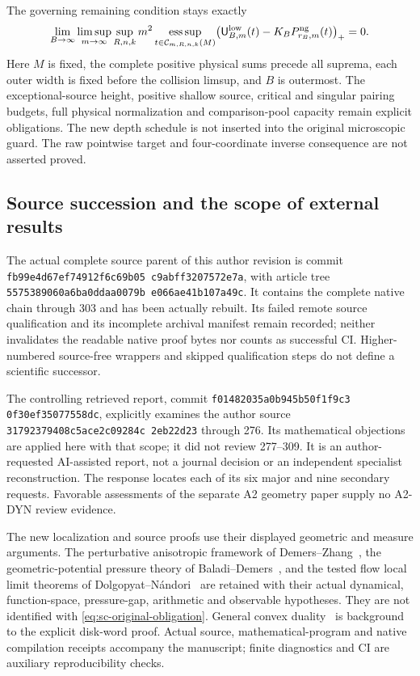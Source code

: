 \documentclass[11pt,reqno]{amsart}
\numberwithin{equation}{section}
\theoremstyle{definition}\newtheorem{definition}[theorem]{Definition}
\theoremstyle{remark}\newtheorem{remark}[theorem]{Remark}
\begin{document}
The governing remaining condition stays exactly
\begin{equation}\label{eq:sc-original-obligation}
 \lim_{B\to\infty}\limsup_{m\to\infty}\sup_{R,n,k}
 m^2\operatorname*{ess\,sup}_{t\in\mathcal C_{m,R,n,k}(M)}
 \bigl(\mathsf U^{\rm low}_{B,m}(t)
                   -K_BP^{\rm ng}_{r_B,m}(t)\bigr)_+=0 .
\end{equation}
Here $M$ is fixed, the complete positive physical sums precede all
suprema, each outer width is fixed before the collision limsup,
and $B$ is outermost.  The exceptional-source height, positive
shallow source, critical and singular pairing budgets, full
physical normalization and comparison-pool capacity remain
explicit obligations.  The new depth schedule is not inserted
into the original microscopic guard.  The raw pointwise target
and four-coordinate inverse consequence are not asserted proved.

\subsection*{Source succession and the scope of external results}
The actual complete source parent of this author revision is
commit
\texttt{fb99e4d6\allowbreak 7ef74912\allowbreak f6c69b05\allowbreak
c9abff32\allowbreak 07572e7a},
with article tree
\texttt{55753890\allowbreak 60a6ba0d\allowbreak daa0079b\allowbreak
e066ae41\allowbreak b107a49c}.
It contains the complete native chain through 303 and has been
actually rebuilt.  Its failed remote source qualification and its
incomplete archival manifest remain recorded; neither invalidates
the readable native proof bytes nor counts as successful CI.
Higher-numbered source-free wrappers and skipped qualification
steps do not define a scientific successor.

The controlling retrieved report, commit
\texttt{f0148203\allowbreak 5a0b945b\allowbreak 50f1f9c3\allowbreak
0f30ef35\allowbreak 077558dc},
explicitly examines the author source
\texttt{31792379\allowbreak 408c5ace\allowbreak 2c09284c\allowbreak
2eb22d23}
through 276.  Its mathematical objections are applied here with
that scope; it did not review 277--309.  It is an author-requested
AI-assisted report, not a journal decision or an independent
specialist reconstruction.  The response locates each of its six
major and nine secondary requests.  Favorable assessments of the
separate A2 geometry paper supply no A2-DYN review evidence.

The new localization and source proofs use their displayed
geometric and measure arguments.  The perturbative anisotropic
framework of Demers--Zhang~\cite{DZUniform}, the
geometric-potential pressure theory of
Baladi--Demers~\cite{BDPressure}, and the tested flow local limit
theorems of Dolgopyat--N\'andori~\cite{DNFlow} are retained with
their actual dynamical, function-space, pressure-gap, arithmetic
and observable hypotheses.  They are not identified with
\eqref{eq:sc-original-obligation}.  General convex
duality~\cite{BVNotes} is background to the explicit disk-word
proof.  Actual source, mathematical-program and native compilation
receipts accompany the manuscript; finite diagnostics and CI are
auxiliary reproducibility checks.
\end{document}
